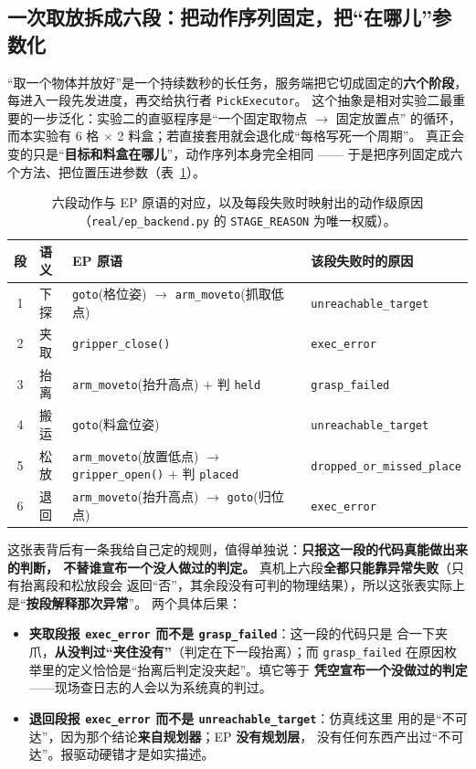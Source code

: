 \documentclass[12pt,a4paper]{ctexart}
\begin{document}
\subsection{一次取放拆成六段：把动作序列固定，把“在哪儿”参数化}

“取一个物体并放好”是一个持续数秒的长任务，服务端把它切成固定的\textbf{六个阶段}，
每进入一段先发进度，再交给执行者 \texttt{PickExecutor}。
这个抽象是相对实验二最重要的一步泛化：实验二的直驱程序是“一个固定取物点 $\to$ 固定放置点”
的循环，而本实验有 6 格 $\times$ 2 料盒；若直接套用就会退化成“每格写死一个周期”。
真正会变的只是“\textbf{目标和料盒在哪儿}”，动作序列本身完全相同 ——
于是把序列固定成六个方法、把位置压进参数（表~\ref{tab:stage}）。

\begin{table}[htbp]
  \centering
  \small
  \begin{tabular}{@{}c l p{5.4cm} p{4.4cm}@{}}
    \toprule
    段 & 语义 & EP 原语 & 该段失败时的原因 \\
    \midrule
    1 & 下探 & \texttt{goto}(格位姿) $\to$ \texttt{arm\_moveto}(抓取低点) & \texttt{unreachable\_target} \\
    2 & 夹取 & \texttt{gripper\_close()} & \texttt{exec\_error} \\
    3 & 抬离 & \texttt{arm\_moveto}(抬升高点) $+$ 判 \texttt{held} & \texttt{grasp\_failed} \\
    4 & 搬运 & \texttt{goto}(料盒位姿) & \texttt{unreachable\_target} \\
    5 & 松放 & \texttt{arm\_moveto}(放置低点) $\to$ \texttt{gripper\_open()} $+$ 判 \texttt{placed} & \texttt{dropped\_or\_}\allowbreak\texttt{missed\_place} \\
    6 & 退回 & \texttt{arm\_moveto}(抬升高点) $\to$ \texttt{goto}(归位点) & \texttt{exec\_error} \\
    \bottomrule
  \end{tabular}
  \caption{六段动作与 EP 原语的对应，以及每段失败时映射出的动作级原因
  （\texttt{real/ep\_backend.py} 的 \texttt{STAGE\_REASON} 为唯一权威）。}
  \label{tab:stage}
\end{table}

这张表背后有一条我给自己定的规则，值得单独说：\textbf{只报这一段的代码真能做出来的判断，
不替谁宣布一个没人做过的判定。} 真机上六段\textbf{全都只能靠异常失败}（只有抬离段和松放段会
返回“否”，其余段没有可判的物理结果），所以这张表实际上是“\textbf{按段解释那次异常}”。
两个具体后果：

\begin{itemize}[leftmargin=1.6em]
  \item \textbf{夹取段报 \texttt{exec\_error} 而不是 \texttt{grasp\_failed}}：这一段的代码只是
        合一下夹爪，\textbf{从没判过“夹住没有”}（判定在下一段抬离）；而
        \texttt{grasp\_failed} 在原因枚举里的定义恰恰是“抬离后判定没夹起”。填它等于
        \textbf{凭空宣布一个没做过的判定}——现场查日志的人会以为系统真的判过。
  \item \textbf{退回段报 \texttt{exec\_error} 而不是 \texttt{unreachable\_target}}：仿真线这里
        用的是“不可达”，因为那个结论\textbf{来自规划器}；EP \textbf{没有规划层}，
        没有任何东西产出过“不可达”。报驱动硬错才是如实描述。
\end{itemize}
\end{document}
